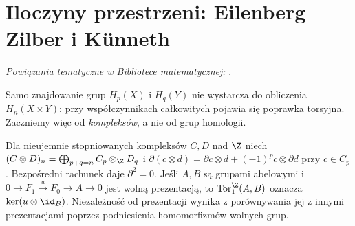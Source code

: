 \section{Iloczyny przestrzeni: Eilenberg--Zilber i Künneth}
\label{sec:ez-kunneth-v4}

\noindent\emph{Powiązania tematyczne w Bibliotece matematycznej:} .


Samo znajdowanie grup $H_p(X)$ i $H_q(Y)$ nie wystarcza do
obliczenia $H_n(X\times Y)$: przy współczynnikach całkowitych
pojawia się poprawka torsyjna. Zaczniemy więc od \emph{kompleksów},
a nie od grup homologii.

\begin{definicja}
Dla nieujemnie stopniowanych kompleksów $C,D$ nad $\Z$ niech
$(C\otimes D)_n=\bigoplus_{p+q=n}C_p\otimes_\Z D_q$ i
$\partial(c\otimes d)=\partial c\otimes d+(-1)^p c\otimes\partial d$
przy $c\in C_p$. Bezpośredni rachunek daje $\partial^2=0$.
Jeśli $A,B$ są grupami abelowymi i
$0\to F_1\xrightarrow{u}F_0\to A\to0$ jest wolną prezentacją,
to $\operatorname{Tor}^{\Z}_1(A,B)$ oznacza
$\ker(u\otimes\id_B)$. Niezależność od prezentacji wynika
z porównywania jej z innymi prezentacjami poprzez podniesienia
homomorfizmów wolnych grup.
\end{definicja}


